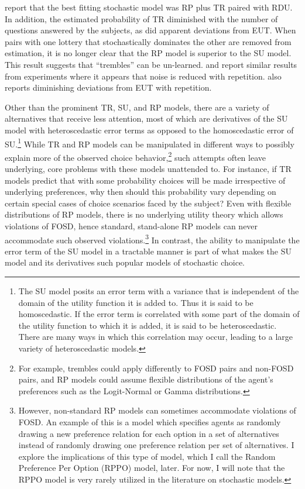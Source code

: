 \documentclass[../main.tex]{subfiles}
\begin{document}
\textcite{Loomes2002} report that the best fitting stochastic model was RP plus TR paired with RDU.
In addition, the estimated probability of TR diminished with the number of questions answered by the subjects, as did apparent deviations from EUT.
When pairs with one lottery that stochastically dominates the other are removed from estimation, it is no longer clear that the RP model is superior to the SU model.
This result suggests that \enquote{trembles} can be un-learned.
\textcite{Hey2001} and \textcite{Moffatt2002} report similar results from experiments where it appears that noise is reduced with repetition.
\textcite{Hey2001} also reports diminishing deviations from EUT with repetition.

Other than the prominent TR, SU, and RP models, there are a variety of alternatives that receive less attention, most of which are derivatives of the SU model with heteroscedastic error terms as opposed to the homoscedastic error of SU.\footnote{
	The SU model posits an error term with a variance that is independent of the domain of the utility function it is added to.
	Thus it is said to be homoscedastic.
	If the error term is correlated with some part of the domain of the utility function to which it is added, it is said to be heteroscedastic.
	There are many ways in which this correlation may occur, leading to a large variety of heteroscedastic models.}
While TR and RP models can be manipulated in different ways to possibly explain more of the observed choice behavior,\footnote{
	For example, trembles could apply differently to FOSD pairs and non-FOSD pairs, and RP models could assume flexible distributions of the agent's preferences such as the Logit-Normal or Gamma distributions.
} such attempts often leave underlying, core problems with these models unattended to.
For instance, if TR models predict that with some probability choices will be made irrespective of underlying preferences, why then should this probability vary depending on certain special cases of choice scenarios faced by the subject? Even with flexible distributions of RP models, there is no underlying utility theory which allows violations of FOSD, hence standard, stand-alone RP models can never accommodate such observed violations.\footnote{
	However, non-standard RP models can sometimes accommodate violations of FOSD.
	An example of this is a model which specifies agents as randomly drawing a new preference relation for each option in a set of alternatives instead of randomly drawing one preference relation per set of alternatives.
	I explore the implications of this type of model, which I call the Random Preference Per Option (RPPO) model, later.
	For now, I will note that the RPPO model is very rarely utilized in the literature on stochastic models.
}
In contrast, the ability to manipulate the error term of the SU model in a tractable manner is part of what makes the SU model and its derivatives such popular models of stochastic choice.
\end{document}
